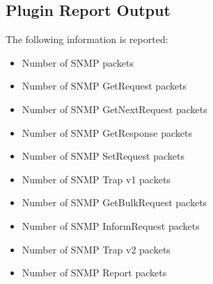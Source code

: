 \documentclass[documentation]{subfiles}
\begin{document}
\subsection{Plugin Report Output}
The following information is reported:
\begin{itemize}
    \item Number of SNMP packets
    \item Number of SNMP GetRequest packets
    \item Number of SNMP GetNextRequest packets
    \item Number of SNMP GetResponse packets
    \item Number of SNMP SetRequest packets
    \item Number of SNMP Trap v1 packets
    \item Number of SNMP GetBulkRequest packets
    \item Number of SNMP InformRequest packets
    \item Number of SNMP Trap v2 packets
    \item Number of SNMP Report packets
\end{itemize}






\end{document}
